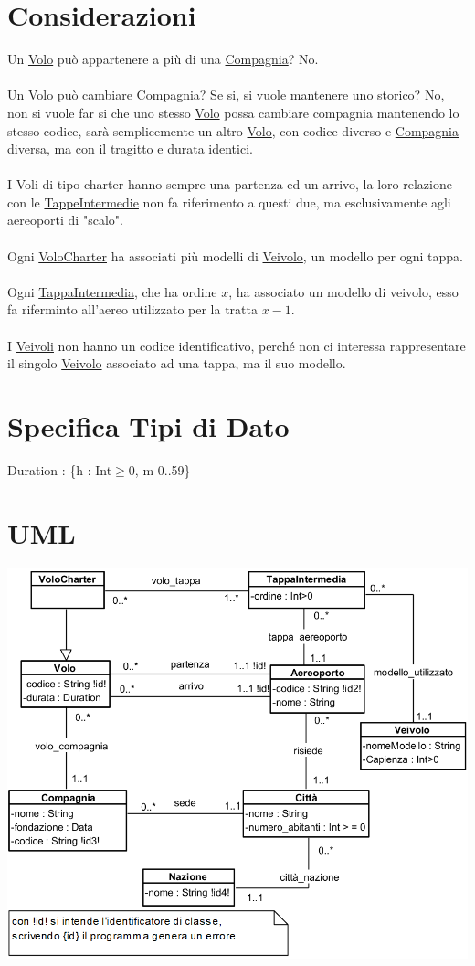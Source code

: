 \documentclass[12pt, letterpaper]{article}
\newcommand{\acc}{\\\hphantom{}\\}
\begin{document}
\section{Considerazioni}
Un \underline{Volo} può appartenere a più di una \underline{Compagnia}? No.\acc 
Un \underline{Volo} può cambiare \underline{Compagnia}? Se si, si vuole mantenere uno storico? No, non si vuole far si che uno stesso 
\underline{Volo} possa cambiare compagnia mantenendo lo stesso codice, sarà semplicemente un altro  \underline{Volo}, con codice 
diverso e \underline{Compagnia} diversa, ma con il tragitto e durata identici.\acc
I Voli di tipo charter hanno sempre una partenza ed un arrivo, la loro relazione con le \underline{TappeIntermedie} non 
fa riferimento a questi due, ma esclusivamente agli aereoporti di "scalo".
\acc 
Ogni \underline{VoloCharter} ha associati più modelli di \underline{Veivolo}, un modello per ogni tappa.
\acc 
Ogni \underline{TappaIntermedia}, che ha ordine $x$, ha associato un modello di veivolo, esso fa riferminto all'aereo utilizzato 
per la tratta $x-1$.\acc 
I \underline{Veivoli} non hanno un codice identificativo, perché non ci interessa rappresentare il singolo 
\underline{Veivolo} associato ad una tappa, ma il suo modello.
\section{Specifica Tipi di Dato}
Duration : \{h : Int\(\ge\)0, m 0..59\}
\newpage
\section{UML}
\includegraphics[width=\textwidth]{images/UML.png}
\end{document}
